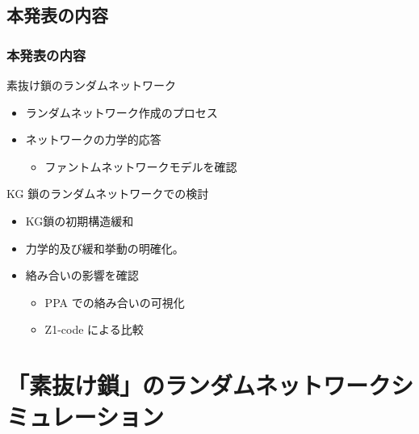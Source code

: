 \documentclass[12pt, dvipdfmx]{beamer}
\begin{document}
\begin{frame}
\begin{columns}[totalwidth=1\textwidth]
    \end{columns}
\end{frame}

\subsection{本発表の内容}
\begin{frame}
	\frametitle{本発表の内容}
		\begin{block}{素抜け鎖のランダムネットワーク}
			\begin{itemize}
				\item ランダムネットワーク作成のプロセス
				\item ネットワークの力学的応答
				\begin{itemize}
					\item \alert{ファントムネットワークモデル}を確認
				\end{itemize}
			\end{itemize}
		\end{block}
		\begin{alertblock}{KG 鎖のランダムネットワークでの検討}
			\begin{itemize}
				\item KG鎖の初期構造緩和
				\item 力学的及び緩和挙動の明確化。
				\item 絡み合いの影響を確認
				\begin{itemize}
					\item PPA での絡み合いの可視化
					\item Z1-code による比較
				\end{itemize}
			\end{itemize}
		\end{alertblock}
\end{frame}


\section{「素抜け鎖」のランダムネットワークシミュレーション}
\end{document}
